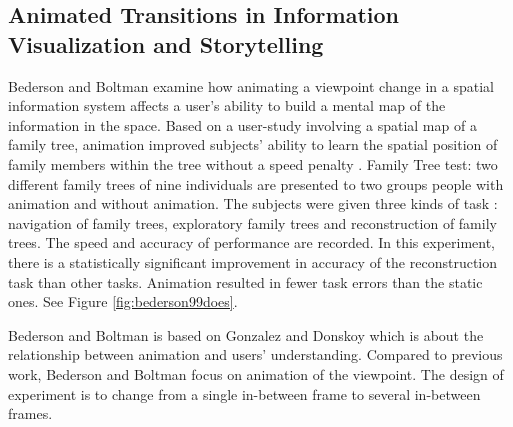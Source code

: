 \documentclass{egpubl}
\begin{document}
\subsection{Animated Transitions in Information Visualization and Storytelling}
Bederson and Boltman examine how animating a viewpoint change in a spatial information system affects a user's ability to build a mental map of the information in the space. Based on a user-study involving a spatial map of a family tree, animation improved subjects' ability to learn the spatial position of family members within the tree without a speed penalty \cite{bedrson}.
Family Tree test: two different family trees of nine individuals are presented to two groups people with animation and without animation. The subjects were given three kinds of task : navigation of family trees, exploratory family trees and reconstruction of family trees. The speed and accuracy of performance are recorded. In this experiment, there is a statistically significant improvement in accuracy of the reconstruction task than other tasks. Animation resulted in fewer task errors than the static ones. See Figure \ref{fig:bederson99does}.

Bederson and Boltman is based on Gonzalez \cite{gonzalez} and Donskoy \cite{donskoy} which is about the relationship between animation and users' understanding. Compared to previous work, Bederson and Boltman focus on animation of the viewpoint. The design of experiment is to change from a single in-between frame to several in-between frames.
\end{document}
